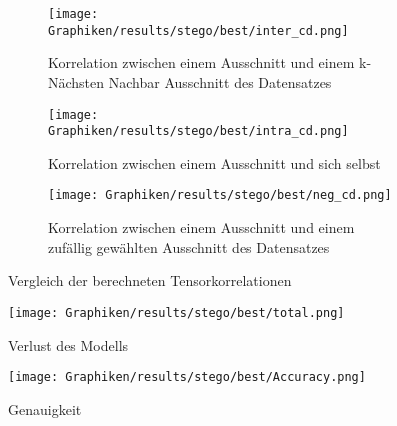       
    \begin{figure}[h!]
        \begin{subfigure}[h]{0.45\linewidth}
            \texttt{[image: Graphiken/results/stego/best/inter\_cd.png]}
            \caption{ Korrelation zwischen einem Ausschnitt und einem k-Nächsten Nachbar Ausschnitt des Datensatzes}
        \end{subfigure}
        \hfill
        \begin{subfigure}[h]{0.45\linewidth}
            \texttt{[image: Graphiken/results/stego/best/intra\_cd.png]}
            \caption{ Korrelation zwischen einem Ausschnitt und sich selbst }
        \end{subfigure}
        \hfill
        \begin{subfigure}[h]{0.45\linewidth}
            \texttt{[image: Graphiken/results/stego/best/neg\_cd.png]}
            \caption{ Korrelation zwischen einem Ausschnitt und einem zufällig gewählten Ausschnitt des Datensatzes}
        \end{subfigure}
        \caption{Vergleich der berechneten Tensorkorrelationen}
    \end{figure}
    
    \begin{figure}[h!]
        \centering
        \texttt{[image: Graphiken/results/stego/best/total.png]}
        \caption{Verlust des Modells}       
        \label{fig:stego_best_loss}
    \end{figure}
    
    \begin{figure}[h!]
        \centering
        \texttt{[image: Graphiken/results/stego/best/Accuracy.png]}
        \caption{Genauigkeit}
        \label{fig:stego_best_acc}
    \end{figure}
    

